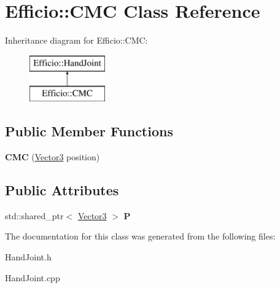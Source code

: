 \hypertarget{class_efficio_1_1_c_m_c}{}\section{Efficio\+:\+:C\+MC Class Reference}
\label{class_efficio_1_1_c_m_c}
Inheritance diagram for Efficio\+:\+:C\+MC\+:\begin{figure}[H]
\begin{center}
\leavevmode
\includegraphics[height=2.000000cm]{class_efficio_1_1_c_m_c}
\end{center}
\end{figure}
\subsection*{Public Member Functions}
\begin{DoxyCompactItemize}
\item 
{\bfseries C\+MC} (\hyperlink{class_efficio_1_1_vector3}{Vector3} position)\hypertarget{class_efficio_1_1_c_m_c_a9910bf1a2e57d408a7fbe45db8f11221}{}\label{class_efficio_1_1_c_m_c_a9910bf1a2e57d408a7fbe45db8f11221}

\end{DoxyCompactItemize}
\subsection*{Public Attributes}
\begin{DoxyCompactItemize}
\item 
std\+::shared\+\_\+ptr$<$ \hyperlink{class_efficio_1_1_vector3}{Vector3} $>$ {\bfseries P}\hypertarget{class_efficio_1_1_c_m_c_ab35b4c7100372dfb5b06d4d4797ee48b}{}\label{class_efficio_1_1_c_m_c_ab35b4c7100372dfb5b06d4d4797ee48b}

\end{DoxyCompactItemize}


The documentation for this class was generated from the following files\+:\begin{DoxyCompactItemize}
\item 
Hand\+Joint.\+h\item 
Hand\+Joint.\+cpp\end{DoxyCompactItemize}
